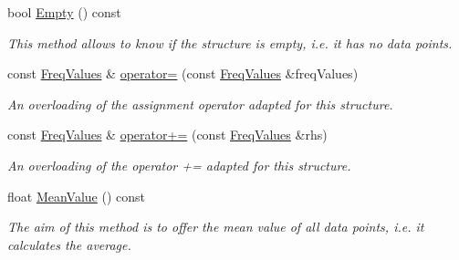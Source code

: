 \begin{DoxyCompactItemize}
\mbox{\label{structFreqValues_ae5a9b788cbf75ad4c3e1dd1ed86a0ddc}} 
bool \hyperlink{structFreqValues_ae5a9b788cbf75ad4c3e1dd1ed86a0ddc}{Empty} () const
\begin{DoxyCompactList}\small\item\em This method allows to know if the structure is empty, i.\+e. it has no data points. \end{DoxyCompactList}\item 
const \hyperlink{structFreqValues}{Freq\+Values} \& \hyperlink{structFreqValues_a11021e293ec300860ffc503d3c37a58c}{operator=} (const \hyperlink{structFreqValues}{Freq\+Values} \&freq\+Values)
\begin{DoxyCompactList}\small\item\em An overloading of the assignment operator adapted for this structure. \end{DoxyCompactList}\item 
const \hyperlink{structFreqValues}{Freq\+Values} \& \hyperlink{structFreqValues_a8024942907aaf5fd4aaa49850bbe6cd5}{operator+=} (const \hyperlink{structFreqValues}{Freq\+Values} \&rhs)
\begin{DoxyCompactList}\small\item\em An overloading of the operator += adapted for this structure. \end{DoxyCompactList}\item 
\mbox{\label{structFreqValues_a954b961f99175f11f09d1cd5d834c545}} 
float \hyperlink{structFreqValues_a954b961f99175f11f09d1cd5d834c545}{Mean\+Value} () const
\begin{DoxyCompactList}\small\item\em The aim of this method is to offer the mean value of all data points, i.\+e. it calculates the average. \end{DoxyCompactList}\end{DoxyCompactItemize}

